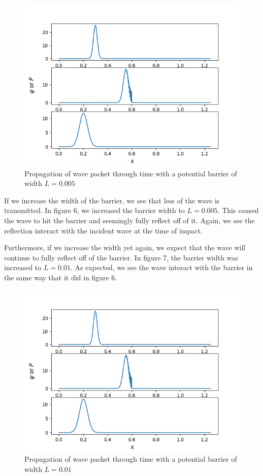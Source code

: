 \documentclass[pra,twocolumn,showpacs,amsmath,amssymb]{revtex4-2}
\begin{document}
\begin{figure}[t!]
\includegraphics[scale=0.50]{Barrier05.png}
\caption{Propagation of wave packet through time with a potential barrier of width $L = 0.005$}\label{autocorr}
\end{figure}

\par If we increase the width of the barrier, we see that less of the wave is transmitted. In figure 6, we increased the barrier width to $L = 0.005$. This caused the wave to hit the barrier and seemingly fully reflect off of it. Again, we see the reflection interact with the incident wave at the time of impact.
\par Furthermore, if we increase the width yet again, we expect that the wave will continue to fully reflect off of the barrier. In figure 7, the barrier width was increased to $L=0.01$. As expected, we see the wave interact with the barrier in the same way that it did in figure 6.

\begin{figure}[t!]
\includegraphics[scale=0.50]{Barrier1.png}
\caption{Propagation of wave packet through time with a potential barrier of width $L = 0.01$}\label{autocorr}
\end{figure}
\end{document}
